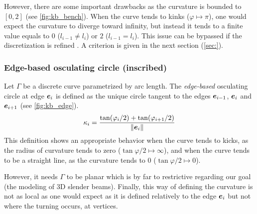 However, there are some important drawbacks as the curvature is bounded to $[0,2]$ (see \cref{fig:kb_bench}). When the curve tends to kinks ($\varphi \mapsto \pi$), one would expect the curvature to diverge toward infinity, but instead it tends to a finite value equals to $0$ ($l_{i-1} \neq l_i$) or $2$ ($l_{i-1} = l_i$). This issue can be bypassed if the discretization is refined . A criterion is given in the next section (\cref{sec:}).


\subsubsection{Edge-based osculating circle (inscribed)}
Let $\Gamma$ be a discrete curve parametrized by arc length. The \emph{edge-based} osculating circle at edge $\boldsymbol{e}_{i}$ is defined as the unique circle tangent to the edges $\boldsymbol{e}_{i-1}$, $\boldsymbol{e}_{i}$ and $\boldsymbol{e}_{i+1}$ (see \cref{fig:kb_edge}).
\begin{equation}
	\kappa_i = \frac{\tan(\varphi_i/2) + \tan(\varphi_{i+1}/2)}{\lVert\boldsymbol{e}_{i}\rVert}
\label{eq:def_kb_edge}
\end{equation}
This definition shows an appropriate behavior when the curve tends to kicks, as the radius of curvature tends to zero ($\tan \varphi/2 \mapsto \infty$), and when the curve tends to be a straight line, as the curvature tends to $0$ ($\tan \varphi/2 \mapsto 0$).

However, it needs $\Gamma$ to be planar which is by far to restrictive regarding our goal (the modeling of 3D slender beams). Finally, this way of defining the curvature is not as local as one would expect as it is defined relatively to the edge $\boldsymbol{e}_{i}$ but not where the turning occurs, at vertices.

